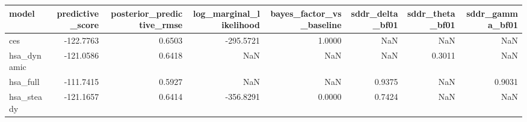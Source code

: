 \begin{tabular}{lrrrrrrr}
\toprule
model & predictive\_score & posterior\_predictive\_rmse & log\_marginal\_likelihood & bayes\_factor\_vs\_baseline & sddr\_delta\_bf01 & sddr\_theta\_bf01 & sddr\_gamma\_bf01 \\
\midrule
ces & -122.7763 & 0.6503 & -295.5721 & 1.0000 & NaN & NaN & NaN \\
hsa\_dynamic & -121.0586 & 0.6418 & NaN & NaN & NaN & 0.3011 & NaN \\
hsa\_full & -111.7415 & 0.5927 & NaN & NaN & 0.9375 & NaN & 0.9031 \\
hsa\_steady & -121.1657 & 0.6414 & -356.8291 & 0.0000 & 0.7424 & NaN & NaN \\
\bottomrule
\end{tabular}
